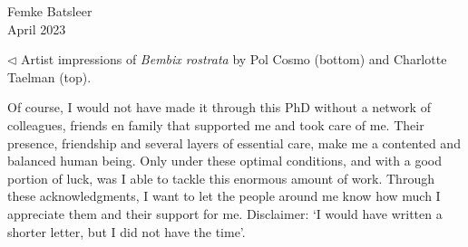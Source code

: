 \documentclass[10pt, twoside]{book} %
\begin{document}
\begin{flushright}
Femke Batsleer\\
April 2023
\end{flushright}

\vspace*{\fill}
\noindent \color{gray} $\lhd$ Artist impressions of \textit{Bembix rostrata} by Pol Cosmo (bottom) and Charlotte Taelman (top).\\
\color{black}
\clearpage
\begin{small}
\noindent Of course, I would not have made it through this PhD without a network of colleagues, friends en family that supported me and took care of me. Their presence, friendship and several layers of essential care, make me a contented and balanced human being. Only under these optimal conditions, and with a good portion of luck, was I able to tackle this enormous amount of work. Through these acknowledgments, I want to let the people around me know how much I appreciate them and their support for me. Disclaimer: `I would have written a shorter letter, but I did not have the time'.\\


\end{small}
\end{document}
